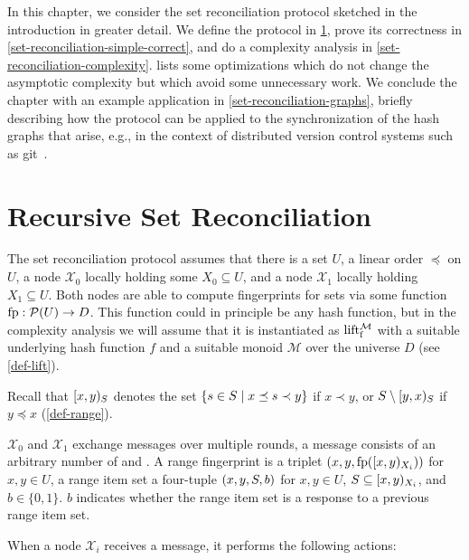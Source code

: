 
In this chapter, we consider the set reconciliation protocol sketched in the introduction in greater detail.
We define the protocol in \cref{set-reconciliation-def}, prove its correctness in \cref{set-reconciliation-simple-correct}, and do a complexity analysis in \cref{set-reconciliation-complexity}.   lists some optimizations which do not change the asymptotic complexity but which avoid some unnecessary work. We conclude the chapter with an example application in \cref{set-reconciliation-graphs}, briefly describing how the protocol can be applied to the synchronization of the hash graphs that arise, e.g., in the context of distributed version control systems such as git~\cite{chacon2014pro}.

\section{Recursive Set Reconciliation}
\label{set-reconciliation-def}

The set reconciliation protocol assumes that there is a set $U$, a linear order $\preceq$ on $U$, a node $\mathcal{X}_0$ locally holding some $X_0 \subseteq U$, and a node $\mathcal{X}_1$ locally holding $X_1 \subseteq U$. Both nodes are able to compute fingerprints for sets via some function ${\operatorname{fp}}: {\mathcal{P}({U})} \rightarrow {D}$. This function could in principle be any hash function, but in the complexity analysis we will assume that it is instantiated as $\operatorname{lift_{\operatorname{f}}^{\mathcal{M}}}$ with a suitable underlying hash function $f$ and a suitable monoid $\mathcal{M}$ over the universe $D$ (see \cref{def-lift}).

Recall that $[{x},{y})_{S}$ denotes the set $\{s \in S \mid x \preceq s \prec y\}$ if $x \prec y$, or $S \setminus [{y},{x})_{S}$ if $y \preceq x$ (\cref{def-range}).

$\mathcal{X}_0$ and $\mathcal{X}_1$ exchange messages over multiple rounds, a message consists of an arbitrary number of  and .
A range fingerprint is a triplet $({x}, {y}, {\operatorname{fp}([{x},{y})_{X_i})})$ for $x, y \in U$, a range item set a four-tuple $({x}, {y}, {S}, {b})$ for $x, y \in U$, $S \subseteq [{x},{y})_{X_i}$, and $b \in \{0, 1\}$. $b$ indicates whether the range item set is a response to a previous range item set.

When a node $\mathcal{X}_i$ receives a message, it performs the following actions:

